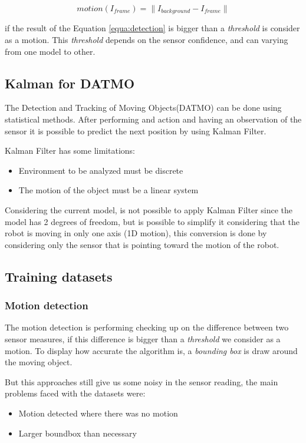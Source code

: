 \documentclass{article}
\begin{document}
\begin{equation}
motion(I_{frame})=\parallel I_{background}-I_{frame} \parallel
\label{equa:detection}
\end{equation}

if the result of the Equation \ref{equa:detection} is bigger than a \emph{threshold} is consider as a motion. This \emph{threshold} depends on the sensor confidence, and can varying from one model to other. 

\subsection{Kalman for DATMO}
The Detection and Tracking of Moving Objects(DATMO) can be done using statistical methods. After performing and action and having an observation of the sensor it is possible to predict the next position by using Kalman Filter. 

Kalman Filter has some limitations:
\begin{itemize}
\item Environment to be analyzed must be discrete
\item The motion of the object must be a linear system
\end{itemize}

Considering the current model, is not possible to apply Kalman Filter since the model has 2 degrees of freedom, but is possible to simplify it considering that the robot is moving in only one axis (1D motion), this conversion is done by considering only the sensor that is pointing toward the motion of the robot.

\subsection{Training datasets}

\subsubsection{Motion detection}

The motion detection is performing checking up on the difference between two sensor measures, if this difference is bigger than a \emph{threshold} we consider as a motion. To display how accurate the algorithm is, a \textit{bounding box} is draw around the moving object.

But this approaches still give us some noisy in the sensor reading, the main problems faced with the datasets were:
\begin{itemize}
\item Motion detected where there was no motion
\item Larger boundbox than necessary
\end{itemize}
\end{document}
